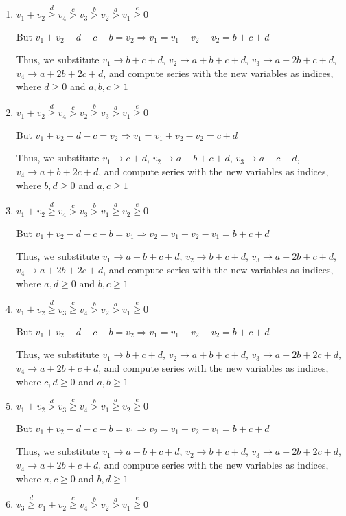\documentclass{article}
\begin{document}
\begin{enumerate}
\item 
$v_1+v_2\overset{d}{\geq}v_4\overset{c}{>}v_3\overset{b}{>}{v_2}\overset{a}{>}v_1\overset{e}{\geq}{0}$

But $v_1+v_2-d-c-b=v_2\Rightarrow{v_1=v_1+v_2-v_2=b+c+d}$

Thus, we substitute 
$v_1\rightarrow{b+c+d}$, $v_2\rightarrow{a+b+c+d}$, $v_3\rightarrow{a+2b+c+d}$, $v_4\rightarrow{a+2b+2c+d}$, and compute series with the new variables as indices, where $d\geq{0}$ and $a,b,c\geq{1}$

\item 
$v_1+v_2\overset{d}{\geq}v_4\overset{c}{>}v_2\overset{b}{\geq}{v_3}\overset{a}{>}v_1\overset{e}{\geq}{0}$

But $v_1+v_2-d-c=v_2\Rightarrow{v_1=v_1+v_2-v_2=c+d}$

Thus, we substitute 
$v_1\rightarrow{c+d}$, $v_2\rightarrow{a+b+c+d}$, $v_3\rightarrow{a+c+d}$, $v_4\rightarrow{a+b+2c+d}$, and compute series with the new variables as indices, where $b,d\geq{0}$ and $a,c\geq{1}$

\item 
$v_1+v_2\overset{d}{\geq}v_4\overset{c}{>}v_3\overset{b}{>}{v_1}\overset{a}{\geq}v_2\overset{e}{\geq}{0}$

But $v_1+v_2-d-c-b=v_1\Rightarrow{v_2=v_1+v_2-v_1=b+c+d}$

Thus, we substitute 
$v_1\rightarrow{a+b+c+d}$, $v_2\rightarrow{b+c+d}$, $v_3\rightarrow{a+2b+c+d}$, $v_4\rightarrow{a+2b+2c+d}$, and compute series with the new variables as indices, where $a,d\geq{0}$ and $b,c\geq{1}$

\item 
$v_1+v_2\overset{d}{\geq}v_3\overset{c}{\geq}v_4\overset{b}{>}{v_2}\overset{a}{>}v_1\overset{e}{\geq}{0}$

But $v_1+v_2-d-c-b=v_2\Rightarrow{v_1=v_1+v_2-v_2=b+c+d}$

Thus, we substitute 
$v_1\rightarrow{b+c+d}$, $v_2\rightarrow{a+b+c+d}$, $v_3\rightarrow{a+2b+2c+d}$, $v_4\rightarrow{a+2b+c+d}$, and compute series with the new variables as indices, where $c,d\geq{0}$ and $a,b\geq{1}$
\item 
$v_1+v_2\overset{d}{>}v_3\overset{c}{\geq}v_4\overset{b}{>}{v_1}\overset{a}{\geq}v_2\overset{e}{\geq}{0}$

But $v_1+v_2-d-c-b=v_1\Rightarrow{v_2=v_1+v_2-v_1=b+c+d}$

Thus, we substitute 
$v_1\rightarrow{a+b+c+d}$, $v_2\rightarrow{b+c+d}$, $v_3\rightarrow{a+2b+2c+d}$, $v_4\rightarrow{a+2b+c+d}$, and compute series with the new variables as indices, where $a,c\geq{0}$ and $b,d\geq{1}$
\item 
$v_3\overset{d}{\geq}v_1+v_2\overset{c}{\geq}v_4\overset{b}{>}{v_2}\overset{a}{>}v_1\overset{e}{\geq}{0}$


\end{enumerate}
\end{document}
